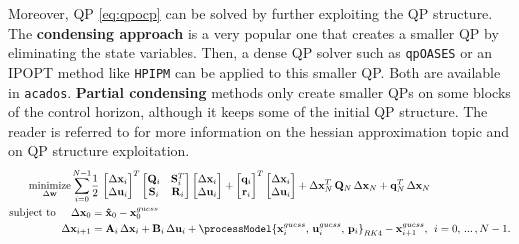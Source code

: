 Moreover, QP \eqref{eq:qpocp} can be solved by further exploiting the QP structure. The \textbf{condensing approach} is a very popular one that creates a smaller QP by eliminating the state variables. Then, a dense QP solver such as \texttt{qpOASES} \cite{ferreau2014qpoases} or an IPOPT method like \texttt{HPIPM} \cite{frison2020hpipm} can be applied to this smaller QP. Both are available in \texttt{acados}. \textbf{Partial condensing} methods only create smaller QPs on some blocks of the control horizon, although it keeps some of the initial QP structure. The reader is referred to \cite{verschueren2022acados, diehl2009efficient} for more information on the hessian approximation topic and on QP structure exploitation.
\begin{subequations}\label{eq:qpocp}
	\begin{align}
		\underset{\Delta \mathbf{w}}{\text{minimize}} \sum_{i=0}^{N-1} & \frac{1}{2} \, \begin{bmatrix}
		\Delta \mathbf{x}_i\\
		\Delta \mathbf{u}_i
\end{bmatrix}^T \begin{bmatrix}
\mathbf{Q}_i & \mathbf{S}_i^T\\
\mathbf{S}_i & \mathbf{R}_i
\end{bmatrix} \begin{bmatrix}
		\Delta \mathbf{x}_i\\
		\Delta \mathbf{u}_i
\end{bmatrix} + \begin{bmatrix}
		\mathbf{q}_i\\
		\mathbf{r}_i
\end{bmatrix}^T \begin{bmatrix}
		\Delta \mathbf{x}_i\\
		\Delta \mathbf{u}_i
\end{bmatrix} + \Delta \mathbf{x}_N^T \, \mathbf{Q}_N \, \Delta \mathbf{x}_N + \mathbf{q}_N^T \, \Delta \mathbf{x}_N \label{subeq:qpobjective}\\
		\text{subject to} \hspace{5mm} \Delta \mathbf{x}_0 &= \mathbf{\hat{x}}_0 - \mathbf{x}_0^{guess} \label{subeq:qpinitialstate}\\
		\Delta \mathbf{x}_{i+1} &= \mathbf{A}_i \, \Delta \mathbf{x}_i + \mathbf{B}_i \, \Delta \mathbf{u}_i + \processModel{\mathbf{x}_i^{guess},\, \mathbf{u}_i^{guess},\,\mathbf{p}_i}_{RK4} - \mathbf{x}_{i+1}^{guess},\, \hspace{0.1cm} i= 0,\,...\,,N-1. \label{subeq:qpcontinuity}\\

\end{align}
\end{subequations}
